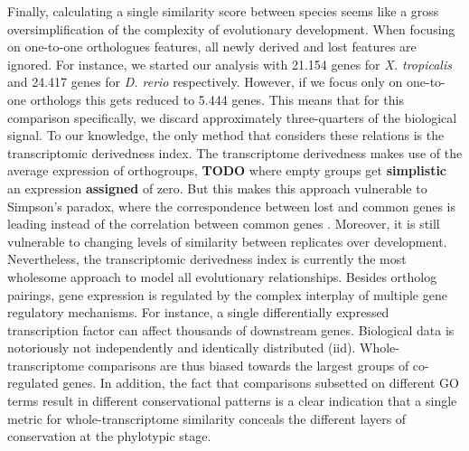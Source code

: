 Finally, calculating a single similarity score between species seems like a gross oversimplification of the complexity of evolutionary development. When focusing on one-to-one orthologues features, all newly derived and lost features are ignored. For instance, we started our analysis with 21.154 genes for \textit{X. tropicalis} and 24.417 genes for \textit{D. rerio} respectively. However, if we focus only on one-to-one orthologs this gets reduced to 5.444 genes. This means that for this comparison specifically, we discard approximately three-quarters of the biological signal. To our knowledge, the only method that considers these relations is the transcriptomic derivedness index\cite{Leong2021}. The transcriptome derivedness makes use of the average expression of orthogroups, \textbf{TODO} where empty groups get \textbf{simplistic} an expression\textbf{ assigned} of zero. But this makes this approach vulnerable to Simpson's paradox, where the correspondence between lost and common genes is leading instead of the correlation between common genes \cite{Saccenti2023}. Moreover, it is still vulnerable to changing levels of similarity between replicates over development. Nevertheless, the transcriptomic derivedness index is currently the most wholesome approach to model all evolutionary relationships. Besides ortholog pairings, gene expression is regulated by the complex interplay of multiple gene regulatory mechanisms. For instance, a single differentially expressed transcription factor can affect thousands of downstream genes. Biological data is notoriously not independently and identically distributed (iid). Whole-transcriptome comparisons are thus biased towards the largest groups of co-regulated genes. In addition, the fact that comparisons subsetted on different GO terms result in different conservational patterns is a clear indication that a single metric for whole-transcriptome similarity conceals the different layers of conservation at the phylotypic stage\cite{Malik2017,Gildor2019,Onimaru2021}.


